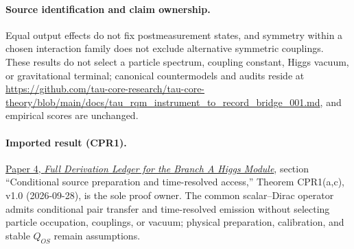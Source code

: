 \documentclass[11pt]{article}
\begin{document}
\paragraph{Source identification and claim ownership.}
Equal output effects do not fix postmeasurement states, and symmetry within a chosen interaction family does not exclude alternative symmetric couplings. These results do not select a particle spectrum, coupling constant, Higgs vacuum, or gravitational terminal; canonical countermodels and audits reside at \url{https://github.com/tau-core-research/tau-core-theory/blob/main/docs/tau_rqm_instrument_to_record_bridge_001.md}, and empirical scores are unchanged.

\paragraph{Imported result (CPR1).}
\href{https://github.com/tau-core-research/tau-core-higgs-module-paper4/blob/main/paper4_full_derivation/full_derivation.pdf#nameddest=cpr1}{Paper 4, \emph{Full Derivation Ledger for the Branch A Higgs Module}}, section ``Conditional source preparation and time-resolved access,'' Theorem CPR1(a,c), v1.0 (2026-09-28), is the sole proof owner.
The common scalar--Dirac operator admits conditional pair transfer and time-resolved emission without selecting particle occupation, couplings, or vacuum; physical preparation, calibration, and stable $Q_{OS}$ remain assumptions.
\end{document}
